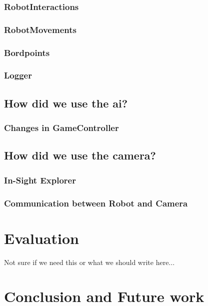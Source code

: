 \documentclass[a4paper]{spie}  %
\begin{document}
\begin{large}
\subsubsection{RobotInteractions}
\subsubsection{RobotMovements}
\subsubsection{Bordpoints}
\subsubsection{Logger}
\subsection{How did we use the ai?}
\subsubsection{Changes in GameController}
\subsection{How did we use the camera?}
\subsubsection{In-Sight Explorer}
\subsubsection{Communication between Robot and Camera}
\section{Evaluation}
Not sure if we need this or what we should write here...
\section{Conclusion and Future work}
\end{large}
\newpage


\end{document}
